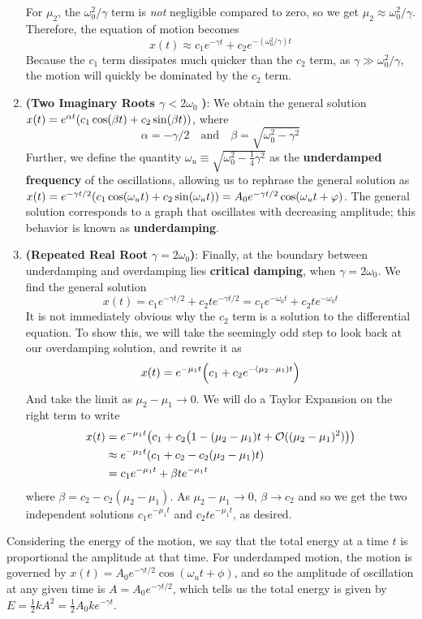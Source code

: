 \begin{enumerate}
    For $\mu_2$, the $\omega_0^2/\gamma$ term is \textit{not} negligible compared to zero, so we get $\mu_2 \approx \omega_0^2/\gamma$. Therefore, the equation of motion becomes
    \[ x(t)\approx c_1e^{-\gamma t} + c_2e^{-(\omega_0^2/\gamma) t}\]
    Because the $c_1$ term dissipates much quicker than the $c_2$ term, as $\gamma \gg \omega_0^2/\gamma$, the motion will quickly be dominated by the $c_2$ term. 
    \item \textbf{(Two Imaginary Roots $\gamma < 2\omega_0$ }\textbf{)}: We obtain the general solution $x(t) = e^{\alpha t}\pqty{c_1 \cos (\beta t) + c_2\sin(\beta t)}$, where 
    \[ \alpha = -\gamma/2  \quad\text{and}\quad \beta = \sqrt{\omega_0^2 - \gamma^2}\]
    Further, we define the quantity $\omega_u \equiv \sqrt{\omega_0^2 - \frac{1}{4}\gamma^2}$ as the \textbf{underdamped frequency} of the oscillations, allowing us to rephrase the general solution as $x(t) = e^{-\gamma t/2}\pqty{c_1\cos(\omega_u t) + c_2\sin(\omega_u t)} = A_0e^{-\gamma t/2}\cos(\omega_u t + \phi)$. The general solution corresponds to a graph that oscillates with decreasing amplitude; this behavior is known as \textbf{underdamping}.
    \item \textbf{(Repeated Real Root} $\gamma = 2\omega_0$\textbf{)}: Finally, at the boundary between underdamping and overdamping lies \textbf{critical damping}, when $\gamma = 2\omega_0$. We find the general solution
    \[ x(t) = c_1 e^{-\gamma t/2} + c_2te^{-\gamma t/2} = c_1e^{-\omega_0t}+c_2te^{-\omega_0 t}\]
    It is not immediately obvious why the $c_2$ term is a solution to the differential equation. To show this, we will take the seemingly odd step to look back at our overdamping solution, and rewrite it as
    \[ x(t) = e^{-\mu_1 t}\pqty{c_1 + c_2e^{-(\mu_2-\mu_1)t} }\]
    And take the limit as $\mu_2-\mu_1 \to 0$. We will do a Taylor Expansion on the right term to write
    \begin{align*}
        x(t) &= e^{-\mu_1 t}\pqty{c_1 + c_2\pqty{1 - (\mu_2-\mu_1)t + \mathcal{O}((\mu_2-\mu_1)^2)}} \\
        &\approx e^{-\mu_1 t}\pqty{c_1 + c_2 -c_2(\mu_2- \mu_1)t} \\
        &= c_1e^{-\mu_1 t} + \beta te^{-\mu_1 t}
    \end{align*}
    where $\beta = c_2 - c_2(\mu_2-\mu_1)$. As $\mu_2-\mu_1 \to 0$, $\beta \to c_2$ and so we get the two independent solutions $c_1e^{-\mu_1 t} $ and $c_2te^{-\mu_1 t}$, as desired. 
\end{enumerate}
Considering the energy of the motion, we say that the total energy at a time $t$ is proportional the amplitude at that time. For underdamped motion, the motion is governed by $x(t) = A_0e^{-\gamma t/2}\cos(\omega_u t + \phi)$, and so the amplitude of oscillation at any given time is $A = A_0e^{-\gamma t/2 }$,  which tells us the total energy is given by $E = \frac{1}{2}kA^2 = \frac{1}{2}A_0ke^{-\gamma t}$. 

